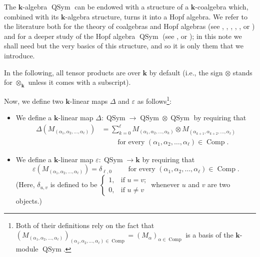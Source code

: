 \documentclass[numbers=enddot,12pt,final,onecolumn,notitlepage,abstracton]{scrartcl}%
\theoremstyle{definition}
\let\sumnonlimits\sum
\renewcommand{\sum}{\sumnonlimits\limits}
\newcommand{\kk}{{\mathbf{k}}}
\newcommand{\Comp}{{\operatorname{Comp}}}
\newcommand{\QSym}{{\operatorname{QSym}}}
\begin{document}
The $\kk$-algebra $\QSym$ can be endowed with a structure of a
$\kk$-coalgebra which, combined with its $\kk$-algebra structure,
turns it into a Hopf algebra. We refer to the literature both for
the theory of coalgebras and Hopf algebras
(see
\cite{Montg-Hopf}, \cite[\S 1]{Reiner}, \cite[\S 1-\S 2]{Manchon-HA},
\cite{Abe-HA}, \cite{Sweedler-HA}, \cite{Dasca-HA} or
\cite[Chapter 7]{Fresse-Op})
and for a deeper study of the Hopf algebra $\QSym$ (see
\cite{Malve-Thesis}, \cite[Chapter 6]{HGK} or
\cite[\S 5]{Reiner}); in this note we shall need but the very
basics of this structure, and so it is only them that we introduce.

In the following, all tensor products are over $\kk$ by
default (i.e., the sign $\otimes$ stands for $\otimes_{\kk}$ unless
it comes with a subscript).

Now, we define two $\kk$-linear maps $\Delta$ and $\varepsilon$
as follows\footnote{Both of their definitions rely on the fact
that
$\left( M_{\left(\alpha_1, \alpha_2, \ldots, \alpha_\ell\right)} \right)_{
   \left(\alpha_1, \alpha_2, \ldots, \alpha_\ell\right) \in \Comp}
= \left( M_\alpha \right)_{\alpha \in \Comp}$
is a basis of the $\kk$-module $\QSym$.}:
\begin{itemize}
\item
We define a $\kk$-linear map $\Delta : \QSym \to \QSym \otimes \QSym$
by requiring that
\begin{align}
\label{eq.coproduct.M}
\Delta \left( M_{\left( \alpha_1, \alpha_2, \ldots, \alpha_\ell
\right) }\right)
&= \sum_{k=0}^{\ell} M_{\left( \alpha_1, \alpha_2, \ldots,
\alpha_k \right) } \otimes M_{\left( \alpha_{k+1}, \alpha_{k+2},
\ldots, \alpha_\ell \right) } \\
& \qquad \text{ for every } \left(\alpha_1, \alpha_2,
\ldots, \alpha_\ell\right) \in \Comp . \nonumber
\end{align}
\item We define a $\kk$-linear map
$\varepsilon : \QSym \to \kk$ by requiring that
\[
\varepsilon\left(  M_{\left(
\alpha_1, \alpha_2, \ldots, \alpha_\ell \right) }\right)
= \delta_{\ell, 0}
\qquad \text{ for every } \left(\alpha_1, \alpha_2,
\ldots, \alpha_\ell\right) \in \Comp .
\]
(Here, $\delta_{u,v}$ is defined to be
$\begin{cases}
1, & \text{if }u = v \text{;}\\
0, & \text{if }u \neq v
\end{cases}$
whenever $u$ and $v$ are two objects.)
\end{itemize}
\end{document}
